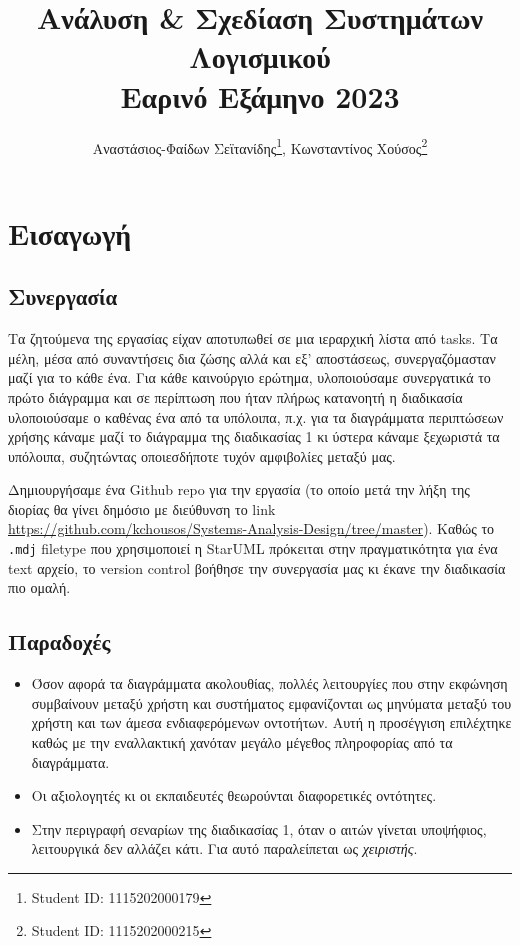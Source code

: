 \documentclass[a4paper, titlepage, twoside]{article}
\author{Αναστάσιος-Φαίδων Σεϊτανίδης\thanks{Student ID: 1115202000179}, Κωνσταντίνος Χούσος\thanks{Student ID: 1115202000215}}
\date{}
\title{Ανάλυση \& Σχεδίαση Συστημάτων Λογισμικού\\\medskip
\large Εαρινό Εξάμηνο 2023}
\begin{document}
\maketitle
\tableofcontents


\newpage

\section{Εισαγωγή}
\label{sec:org1d4a4e6}


\subsection{Συνεργασία}
\label{sec:org07522c1}

Τα ζητούμενα της εργασίας είχαν αποτυπωθεί σε μια ιεραρχική λίστα από tasks. Τα μέλη, μέσα από συναντήσεις δια ζώσης αλλά και εξ' αποστάσεως, συνεργαζόμασταν μαζί για το κάθε ένα. Για κάθε καινούργιο ερώτημα, υλοποιούσαμε συνεργατικά το πρώτο διάγραμμα και σε περίπτωση που ήταν πλήρως κατανοητή η διαδικασία υλοποιούσαμε ο καθένας ένα από τα υπόλοιπα, π.χ. για τα διαγράμματα περιπτώσεων χρήσης κάναμε μαζί το διάγραμμα της διαδικασίας 1 κι ύστερα κάναμε ξεχωριστά τα υπόλοιπα, συζητώντας οποιεσδήποτε τυχόν αμφιβολίες μεταξύ μας.

Δημιουργήσαμε ένα Github repo για την εργασία (το οποίο μετά την λήξη της διορίας θα γίνει δημόσιο με διεύθυνση το link \url{https://github.com/kchousos/Systems-Analysis-Design/tree/master}). Καθώς το \texttt{.mdj} filetype που χρησιμοποιεί η StarUML πρόκειται στην πραγματικότητα για ένα text αρχείο, το version control βοήθησε την συνεργασία μας κι έκανε την διαδικασία πιο ομαλή.

\subsection{Παραδοχές}
\label{sec:org9c2621e}

\begin{itemize}
\item Όσον αφορά τα διαγράμματα ακολουθίας, πολλές λειτουργίες που στην εκφώνηση συμβαίνουν μεταξύ χρήστη και συστήματος εμφανίζονται ως μηνύματα μεταξύ του χρήστη και των άμεσα ενδιαφερόμενων οντοτήτων. Αυτή η προσέγγιση επιλέχτηκε καθώς με την εναλλακτική χανόταν μεγάλο μέγεθος πληροφορίας από τα διαγράμματα.
\item Οι αξιολογητές κι οι εκπαιδευτές θεωρούνται διαφορετικές οντότητες.
\item Στην περιγραφή σεναρίων της διαδικασίας 1, όταν ο αιτών γίνεται υποψήφιος, λειτουργικά δεν αλλάζει κάτι. Για αυτό παραλείπεται ως \emph{χειριστής}.
\end{itemize}
\end{document}

